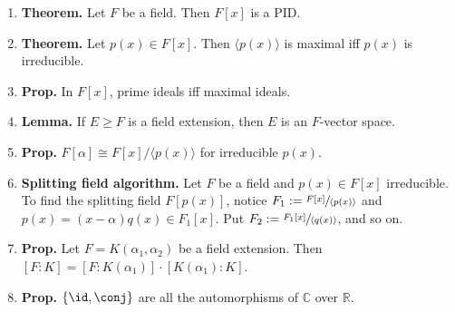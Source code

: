 \begin{enumerate}
	\begin{center}
		\hrule
	\end{center}
	\item \textbf{Theorem. } Let $F$ be a field. Then $F[x]$ is a PID. 
	\item \textbf{Theorem. } Let $p(x) \in F[x]$. Then $\langle p(x) \rangle$ is maximal iff $p(x)$ is irreducible. 
	\item \textbf{Prop. } In $F[x]$, prime ideals iff maximal ideals. 
	\item \textbf{Lemma. } If $E \geq F$ is a field extension, then $E$ is an $F$-vector space. 
	\item \textbf{Prop. } $F[\alpha] \cong F[x] / \langle p(x) \rangle$ for irreducible $p(x)$. 
	\item \textbf{Splitting field algorithm. } Let $F$ be a field and $p(x) \in F[x]$ irreducible. To find the splitting field $F[p(x)]$, notice $F_1 := \sfrac{F[x]}{\langle p(x) \rangle}$ and $p(x) = (x-\alpha)q(x) \in F_1[x]$. Put $F_2 := \sfrac{F_1[x]}{\langle q(x) \rangle}$, and so on. 
	\item \textbf{Prop. } Let $F = K(\alpha_1,\alpha_2)$ be a field extension. Then $[F:K] = [F:K(\alpha_1)] \cdot [K(\alpha_1):K]$. 
	\item \textbf{Prop. } $\{\id, \conj\}$ are all the automorphisms of $\mathbb{C}$ over $\mathbb{R}$. 
\end{enumerate}


